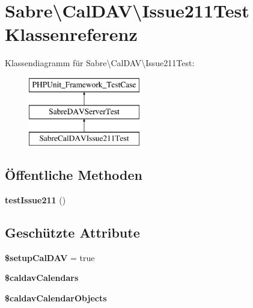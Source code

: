 \hypertarget{class_sabre_1_1_cal_d_a_v_1_1_issue211_test}{}\section{Sabre\textbackslash{}Cal\+D\+AV\textbackslash{}Issue211\+Test Klassenreferenz}
\label{class_sabre_1_1_cal_d_a_v_1_1_issue211_test}
Klassendiagramm für Sabre\textbackslash{}Cal\+D\+AV\textbackslash{}Issue211\+Test\+:\begin{figure}[H]
\begin{center}
\leavevmode
\includegraphics[height=3.000000cm]{class_sabre_1_1_cal_d_a_v_1_1_issue211_test}
\end{center}
\end{figure}
\subsection*{Öffentliche Methoden}
\begin{DoxyCompactItemize}
\item 
\mbox{\label{class_sabre_1_1_cal_d_a_v_1_1_issue211_test_a2c369984f00704d3f012447a2cbaccd4}} 
{\bfseries test\+Issue211} ()
\end{DoxyCompactItemize}
\subsection*{Geschützte Attribute}
\begin{DoxyCompactItemize}
\item 
\mbox{\label{class_sabre_1_1_cal_d_a_v_1_1_issue211_test_aff57d4119e6ae5f45a18954795dc886f}} 
{\bfseries \$setup\+Cal\+D\+AV} = true
\item 
{\bfseries \$caldav\+Calendars}
\item 
{\bfseries \$caldav\+Calendar\+Objects}
\end{DoxyCompactItemize}


